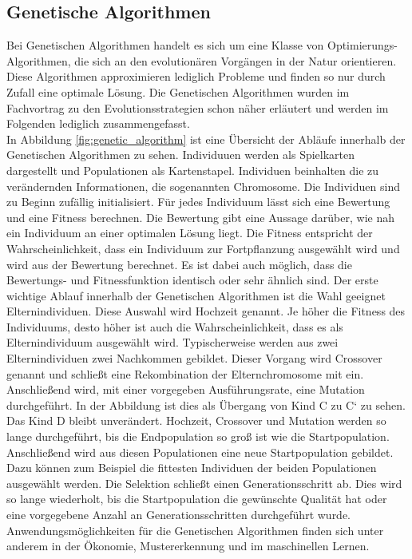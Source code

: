 \subsection{Genetische Algorithmen}
Bei Genetischen Algorithmen \cite[S. 130-132]{tsp} handelt es sich um eine Klasse von Optimierungs-Algorithmen, die sich an den evolutionären Vorgängen in der Natur orientieren. Diese Algorithmen approximieren lediglich Probleme und finden so nur durch Zufall eine optimale Lösung.
Die Genetischen Algorithmen wurden im Fachvortrag zu den Evolutionsstrategien schon näher erläutert und werden im Folgenden lediglich zusammengefasst.\\
In Abbildung \ref{fig:genetic_algorithm} ist eine Übersicht der Abläufe innerhalb der Genetischen Algorithmen zu sehen. Individuuen werden als Spielkarten dargestellt und Populationen als Kartenstapel. Individuen beinhalten die zu verändernden Informationen, die sogenannten Chromosome. Die Individuen sind zu Beginn zufällig initialisiert.
Für jedes Individuum lässt sich eine Bewertung und eine Fitness berechnen. Die Bewertung gibt eine Aussage darüber, wie nah ein Individuum an einer optimalen Lösung liegt.
Die Fitness entspricht der Wahrscheinlichkeit, dass ein Individuum zur Fortpflanzung ausgewählt wird und wird aus der Bewertung berechnet. Es ist dabei auch möglich, dass die Bewertungs- und Fitnessfunktion identisch oder sehr ähnlich sind.
Der erste wichtige Ablauf innerhalb der Genetischen Algorithmen ist die Wahl geeignet Elternindividuen. Diese Auswahl wird Hochzeit genannt. Je höher die Fitness des Individuums, desto höher ist auch die Wahrscheinlichkeit, dass es als Elternindividuum ausgewählt wird.
Typischerweise werden aus zwei Elternindividuen zwei Nachkommen gebildet. Dieser Vorgang wird Crossover genannt und schließt eine Rekombination der Elternchromosome mit ein. Anschließend wird, mit einer vorgegeben Ausführungsrate, eine Mutation durchgeführt. In der Abbildung ist dies als Übergang von Kind C zu C` zu sehen. Das Kind D bleibt unverändert.
Hochzeit, Crossover und Mutation werden so lange durchgeführt, bis die Endpopulation so groß ist wie die Startpopulation. Anschließend wird aus diesen Populationen eine neue Startpopulation gebildet. Dazu können zum Beispiel die fittesten Individuen der beiden Populationen ausgewählt werden.
Die Selektion schließt einen Generationsschritt ab. Dies wird so lange wiederholt, bis die Startpopulation die gewünschte Qualität hat oder eine vorgegebene Anzahl an Generationsschritten durchgeführt wurde.
Anwendungsmöglichkeiten für die Genetischen Algorithmen finden sich unter anderem in der Ökonomie, Mustererkennung und im maschinellen Lernen.

